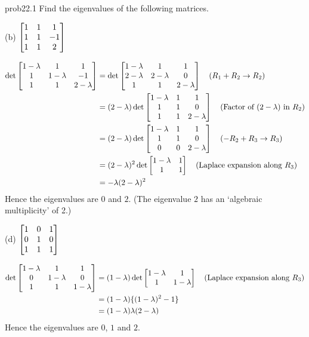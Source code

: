 
\begin{sol}{prob22.1} Find the eigenvalues of the following matrices. 
\medskip

(b)  $\bmatrix 
1&1&1\\1&1&-1\\1&1&2 \endbmatrix $

\soln 

\begin{equation*}
\begin{split}
  \det \bmatrix 
1-\lam&1&1\\1&1-\lam&-1\\1&1&2-\lam \endbmatrix &= \det \bmatrix 
1-\lam&1&1\\2-\lam&2-\lam&0\\1&1&2-\lam \endbmatrix \quad (R_1+R_2\to R_2) \\
  &=(2-\lam)\det \bmatrix 
1-\lam&1&1\\1&1&0\\1&1&2-\lam \endbmatrix \quad (\text{Factor of  }(2-\lam) \text{ in } R_2)\\
  &=(2-\lam)\det \bmatrix 
1-\lam&1&1\\1&1&0\\0&0&2-\lam \endbmatrix \quad (-R_2+R_3\to R_3)\\
  &=(2-\lam)^2 \det \bmatrix 
1-\lam&1\\1&1\endbmatrix \quad (\text{Laplace expansion along }R_3)\\
  &= -\lam(2-\lam)^2\\
\end{split}\end{equation*}
Hence the eigenvalues  are $0$ and $2$. (The eigenvalue $2$ has an `algebraic multiplicity' of 2.)

\medskip

(d) $\bmatrix 
1&0&1\\0&1&0\\1&1&1 \endbmatrix $

\soln 
\begin{equation*}
\begin{split}
 \det  \bmatrix 
1-\lam&1&1\\0&1-\lam&0\\1&1&1-\lam \endbmatrix   &= (1-\lam)\det  \bmatrix 
1-\lam&1\\1&1-\lam \endbmatrix\quad (\text{Laplace expansion along }R_3)\\
  &=(1-\lam)\{(1-\lam)^2-1\} \\
  &=(1-\lam)\lam(2-\lam)
\end{split}\end{equation*}
Hence the eigenvalues  are $0$, $1$ and $2$.
\medskip


\end{sol}
